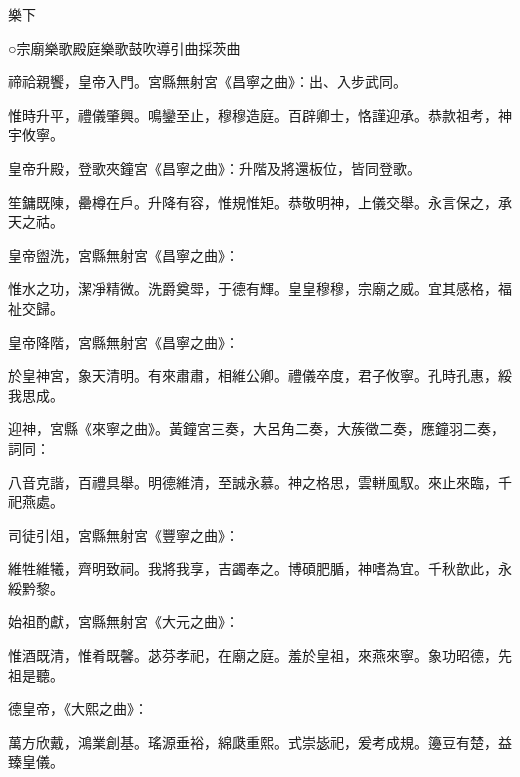 
\begin{pinyinscope}

 樂下



 ○宗廟樂歌殿庭樂歌鼓吹導引曲採茨曲



 禘祫親饗，皇帝入門。宮縣無射宮《昌寧之曲》：出、入步武同。



 惟時升平，禮儀肇興。鳴鑾至止，穆穆造庭。百辟卿士，恪謹迎承。恭款祖考，神宇攸寧。



 皇帝升殿，登歌夾鐘宮《昌寧之曲》：升階及將還板位，皆同登歌。



 笙鏞既陳，罍樽在戶。升降有容，惟規惟矩。恭敬明神，上儀交舉。永言保之，承天之祜。



 皇帝盥洗，宮縣無射宮《昌寧之曲》：



 惟水之功，潔凈精微。洗爵奠斝，于德有輝。皇皇穆穆，宗廟之威。宜其感格，福祉交歸。



 皇帝降階，宮縣無射宮《昌寧之曲》：



 於皇神宮，象天清明。有來肅肅，相維公卿。禮儀卒度，君子攸寧。孔時孔惠，綏我思成。



 迎神，宮縣《來寧之曲》。黃鐘宮三奏，大呂角二奏，大蔟徵二奏，應鐘羽二奏，詞同：



 八音克諧，百禮具舉。明德維清，至誠永慕。神之格思，雲軿風馭。來止來臨，千祀燕處。



 司徒引俎，宮縣無射宮《豐寧之曲》：



 維牲維犧，齊明致祠。我將我享，吉蠲奉之。博碩肥腯，神嗜為宜。千秋歆此，永綏黔黎。



 始祖酌獻，宮縣無射宮《大元之曲》：



 惟酒既清，惟肴既馨。苾芬孝祀，在廟之庭。羞於皇祖，來燕來寧。象功昭德，先祖是聽。



 德皇帝，《大熙之曲》：



 萬方欣戴，鴻業創基。瑤源垂裕，綿瓞重熙。式崇毖祀，爰考成規。籩豆有楚，益臻皇儀。




\end{pinyinscope}
